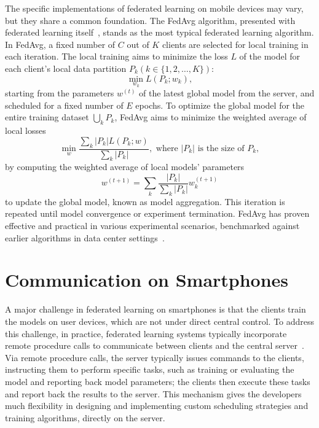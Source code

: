 The specific implementations of federated learning on mobile devices may vary,
but they share a common foundation. The FedAvg algorithm,
presented with federated learning itself~\cite{mcmahan2017communication},
stands as the most typical federated learning algorithm. In FedAvg,
a fixed number of $C$ out of $K$ clients are selected for local training in each
iteration.
The local training aims to minimize the loss $L$ of the model for each client's
local data partition $P_k (k \in \{1, 2, \dots, K\})$:
\begin{equation}
\min_{w_k} L(P_k;w_k),
\end{equation}
starting from the parameters $w^{(t)}$ of the latest global model from the
server, and scheduled for a fixed number of $E$ epochs.
To optimize the global model for the entire training dataset $\bigcup_k P_k$,
FedAvg aims to minimize the weighted average of local losses
\begin{equation}
\min_{w} \frac{\sum_k |P_k|L(P_k;w)}{\sum_k |P_k|},
\text{ where }|P_k|\text{ is the size of }P_k,
\end{equation}
by computing the weighted average of local models' parameters
\begin{equation}
    \label{eq:aggregation}
w^{(t+1)}=\sum_k \frac{|P_k|}{\sum_k |P_k|}w_k^{(t+1)}
\end{equation}
to update the global model, known as model aggregation.
This iteration is repeated until model convergence or experiment termination.
FedAvg has proven effective and practical in various experimental scenarios,
benchmarked against earlier algorithms in data center
settings~\cite{bonawitz2019towards}.

\section{Communication on Smartphones}

A major challenge in federated learning on smartphones is that the clients train
the models on user devices, which are not under direct central control.
To address this challenge, in practice,
federated learning systems typically incorporate remote procedure calls to
communicate between clients and the central
server~\cite{tff,he2020fedml,beutel2020flower,patrick2022openfl,madrigal2023project}.
Via remote procedure calls, the server typically issues commands to the clients,
instructing them to perform specific tasks,
such as training or evaluating the model and reporting back model parameters;
the clients then execute these tasks and report back the results to the server.
This mechanism gives the developers much flexibility in designing and
implementing custom scheduling strategies and training algorithms,
directly on the server.

